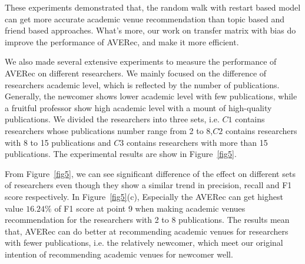 \documentclass[9pt]{acm_proc_article-sp}
\begin{document}
These experiments demonstrated that, the random walk with restart based model can get more accurate academic venue recommendation than topic based and friend based approaches. What's more, our work on transfer matrix with bias do improve the performance of AVERec, and make it more efficient.

We also made several extensive experiments to measure the performance of AVERec on different researchers. We mainly focused on the difference of researchers academic level, which is reflected by the number of publications. Generally, the newcomer shows lower academic level with few publications, while a fruitful professor show high academic level with a mount of high-quality publications. We divided the researchers into three sets, i.e. $C1$ contains researchers whose publications number range from 2 to 8,$C2$ contains researchers with 8 to 15 publications and $C3$ contains researchers with more than 15 publications. The experimental results are show in Figure~\ref{fig5}.


From Figure~\ref{fig5}, we can see significant difference of the effect on different sets of researchers even though they show a similar trend in precision, recall and F1 score respectively. In Figure~\ref{fig5}(c), Especially the AVERec can get highest value $16.24\%$ of F1 score at point 9 when making academic venues recommendation for the researchers with 2 to 8 publications. The results mean that, AVERec can do better at recommending academic venues for researchers with fewer publications, i.e. the relatively newcomer, which meet our original intention of recommending academic venues for newcomer well.


\end{document}
